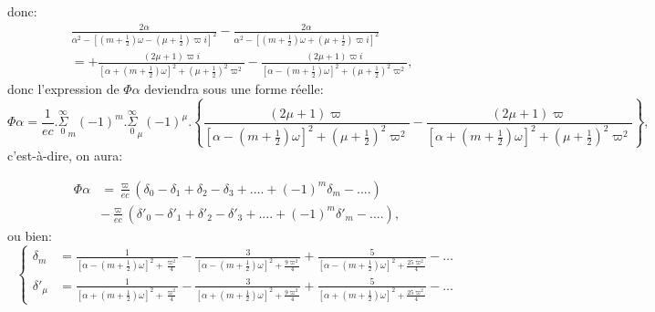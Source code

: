 \documentclass{article}
\begin{document}
donc:
\[ \begin{aligned}&\frac{2\alpha}{\alpha^{2}-[(m+\tfrac{1}{2})\omega-(\mu+\tfrac{1}{2})\varpi i]^{2}}-\frac{2\alpha}{\alpha^{2}-[(m+\tfrac{1}{2})\omega+(\mu+\tfrac{1}{2})\varpi i]^{2}}\\ &=+\frac{(2\mu+1)\varpi i}{[\alpha+(m+\tfrac{1}{2})\omega]^{2}+(\mu+\tfrac{1}{2})^{2}\varpi^{2}}-\frac{(2\mu+1)\varpi i}{[\alpha-(m+\tfrac{1}{2})\omega]^{2}+(\mu+\tfrac{1}{2})^{2}\varpi^{2}},\end{aligned} \]
donc l'expression de $\Phi\alpha$ deviendra sous une forme réelle:
\[ \Phi\alpha=\frac{1}{ec}.\overset{\infty}{\underset{0}{\Sigma}}_{m}(-1)^{m}.\overset{\infty}{\underset{0}{\Sigma}}_{\mu}(-1)^{\mu}.\left\{\frac{(2\mu+1)\varpi}{[\alpha-(m+\tfrac{1}{2})\omega]^{2}+(\mu+\tfrac{1}{2})^{2}\varpi^{2}}-\frac{(2\mu+1)\varpi}{[\alpha+(m+\tfrac{1}{2})\omega]^{2}+(\mu+\tfrac{1}{2})^{2}\varpi^{2}}\right\}, \tag{153.} \]
c'est-à-dire, on aura:

\[ \begin{aligned}\Phi\alpha&=\frac{\varpi}{ec}(\delta_{0}-\delta_{1}+\delta_{2}-\delta_{3}+....+(-1)^{m}\delta_{m}-....)\\ &-\frac{\varpi}{ec}(\delta'_{0}-\delta'_{1}+\delta'_{2}-\delta'_{3}+....+(-1)^{m}\delta'_{m}-....),\end{aligned} \tag{154.} \]
ou bien:
\[ \left\{\begin{aligned}\delta_{m}&=\frac{1}{[\alpha-(m+\tfrac{1}{2})\omega]^{2}+\frac{\varpi^{2}}{4}}-\frac{3}{[\alpha-(m+\tfrac{1}{2})\omega]^{2}+\frac{9\varpi^{2}}{4}}+\frac{5}{[\alpha-(m+\tfrac{1}{2})\omega]^{2}+\frac{25\varpi^{2}}{4}}-\ldots\\ \delta'_{\mu}&=\frac{1}{[\alpha+(m+\tfrac{1}{2})\omega]^{2}+\frac{\varpi^{2}}{4}}-\frac{3}{[\alpha+(m+\tfrac{1}{2})\omega]^{2}+\frac{9\varpi^{2}}{4}}+\frac{5}{[\alpha+(m+\tfrac{1}{2})\omega]^{2}+\frac{25\varpi^{2}}{4}}-\ldots\end{aligned}\right. \tag{155.} \]
\end{document}
